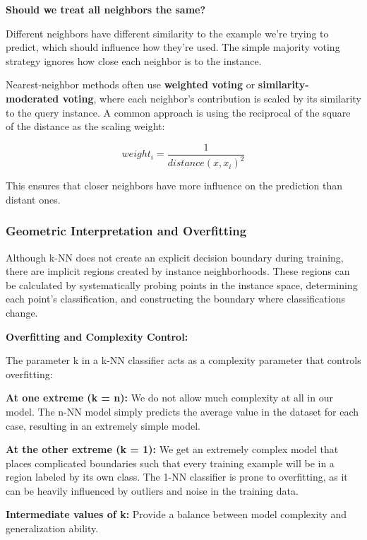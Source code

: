     \textbf{Should we treat all neighbors the same?}
    
    Different neighbors have different similarity to the example we're trying to predict, which should influence how they're used. The simple majority voting strategy ignores how close each neighbor is to the instance.
    
    Nearest-neighbor methods often use \textbf{weighted voting} or \textbf{similarity-moderated voting}, where each neighbor's contribution is scaled by its similarity to the query instance. A common approach is using the reciprocal of the square of the distance as the scaling weight:
    
    \begin{equation}
    weight_i = \frac{1}{distance(x, x_i)^2}
    \end{equation}
    
    This ensures that closer neighbors have more influence on the prediction than distant ones.
    
    \subsubsection{Geometric Interpretation and Overfitting}
    
    Although k-NN does not create an explicit decision boundary during training, there are implicit regions created by instance neighborhoods. These regions can be calculated by systematically probing points in the instance space, determining each point's classification, and constructing the boundary where classifications change.
    
    \textbf{Overfitting and Complexity Control:}
    
    The parameter k in a k-NN classifier acts as a complexity parameter that controls overfitting:
    \begin{compactitemize}
        \item \textbf{At one extreme (k = n):} We do not allow much complexity at all in our model. The n-NN model simply predicts the average value in the dataset for each case, resulting in an extremely simple model.
        \item \textbf{At the other extreme (k = 1):} We get an extremely complex model that places complicated boundaries such that every training example will be in a region labeled by its own class. The 1-NN classifier is prone to overfitting, as it can be heavily influenced by outliers and noise in the training data.
        \item \textbf{Intermediate values of k:} Provide a balance between model complexity and generalization ability.
    \end{compactitemize}
    
